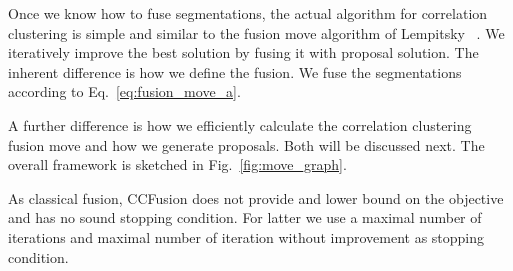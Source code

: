 \documentclass[10pt,twocolumn,letterpaper]{article}
\theoremstyle{definition}
\begin{document}
Once we know how to fuse segmentations, the actual algorithm 
for correlation clustering 
is simple and similar to the fusion move algorithm of Lempitsky \etal~\cite{Lempitsky-2010}.
We iteratively improve the best solution by
fusing it with proposal solution.
The inherent difference is how we define the fusion.
We fuse the segmentations according to Eq.~\ref{eq:fusion_move_a}.

A further difference is how we efficiently calculate the correlation clustering fusion move and how we generate proposals.
Both will be discussed next. The overall framework is sketched in Fig.~\ref{fig:move_graph}.

As classical fusion, CCFusion does not provide and lower bound on the objective and 
has no sound stopping condition.
For latter we use a maximal number of iterations and maximal number of iteration without improvement as stopping condition.




%
%
%

%
\end{document}
